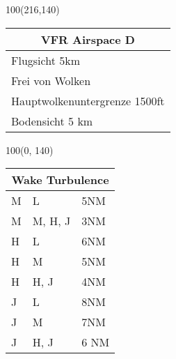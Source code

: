 \documentclass[10pt,landscape,a4paper]{article}
\begin{document}
\begin{textblock}{100}(216,140)
\begin{table}[]
\begin{tabular}{|l|}
\multicolumn{1}{c}{\textbf{VFR Airspace D}} \\ \hline
 Flugsicht 5km   \\ \hline
Frei von Wolken   \\ \hline
Hauptwolkenuntergrenze 1500ft \\ \hline
Bodensicht 5 km \\ \hline
\end{tabular}
\end{table}
\end{textblock}

\begin{textblock}{100}(0, 140)
\begin{table}[]
\begin{tabular}{|l|l|l|}
\multicolumn{3}{c}{\textbf{Wake Turbulence}} \\ \hline
 M  & L  & 5NM   \\ \hline
 M  & M, H, J  & 3NM   \\ \hline
 H  & L & 6NM   \\ \hline
 H  & M & 5NM   \\ \hline
 H  & H, J & 4NM \\ \hline
 J &  L & 8NM \\ \hline
 J &  M & 7NM \\ \hline
 J &  H, J  & 6 NM   \\ \hline
\end{tabular}
\end{table}
\end{textblock}
\end{document}
